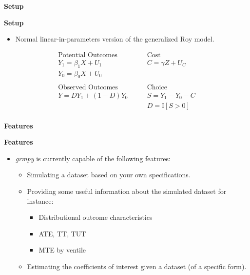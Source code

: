 \begin{frame}\begin{center}
\LARGE\textbf{Setup}
\end{center}\end{frame}



\begin{frame}
\textbf{Setup}

\medskip
\begin{itemize}\setlength\itemsep{1em}
\item Normal linear-in-parameters version of the generalized Roy model.
\end{itemize}
\begin{align*}
\text{Potential Outcomes} &\qquad \text{Cost} \\
Y_1 = \beta_1 X + U_1      &\qquad C = \gamma Z + U_C \\
Y_0 = \beta_0 X + U_0      &\qquad \\
    & \\
\text{Observed Outcomes}  &\qquad \text{Choice} \\
Y = D Y_1 + (1 - D)Y_0 &\qquad S = Y_1 - Y_0 - C \\
                       &\qquad D = \mathrm{I}[S > 0] \\
\end{align*}
\end{frame}

\begin{frame}\begin{center}
\LARGE\textbf{Features}
\end{center}\end{frame}

\begin{frame}
\textbf{Features}

\medskip
\begin{itemize}\setlength\itemsep{1em}
\item \textit{grmpy} is currently capable of the following features:
\begin{itemize}\setlength\itemsep{1em}
  \item Simulating a dataset based on your own specifications.
  \item Providing some useful information about the simulated dataset for instance:
    \begin{itemize}\setlength\itemsep{1em}
    \item Distributional outcome characteristics
    \item ATE, TT, TUT
    \item MTE by ventile
    \end{itemize}
  \item Estimating the coefficients of interest given a dataset (of a specific form).
\end{itemize}
\end{itemize}

\end{frame}

